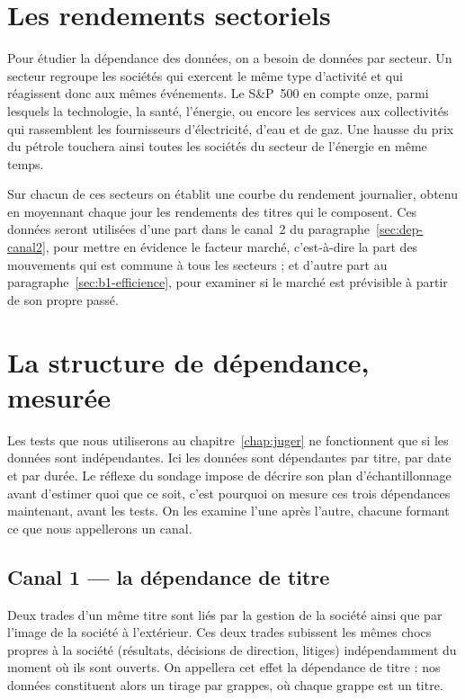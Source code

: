 \section{Les rendements sectoriels}
\label{sec:donnees-secteurs}


Pour étudier la dépendance des données, on a besoin de données par secteur.
Un secteur regroupe les sociétés qui exercent le même type d'activité et qui
réagissent donc aux mêmes événements. Le S\&P~500 en compte onze, parmi
lesquels la technologie, la santé, l'énergie, ou encore les services aux
collectivités qui rassemblent les fournisseurs d'électricité, d'eau et de gaz.
Une hausse du prix du pétrole touchera ainsi toutes les sociétés du secteur de
l'énergie en même temps.

Sur chacun de ces secteurs on établit une courbe du rendement journalier,
obtenu en moyennant chaque jour les rendements des titres qui le composent.
Ces données seront utilisées d'une part dans le canal~2 du
paragraphe~\ref{sec:dep-canal2}, pour mettre en évidence le facteur
marché, c'est-à-dire la part des mouvements qui est commune à tous les
secteurs ; et d'autre part au paragraphe~\ref{sec:b1-efficience}, pour
examiner si le marché est prévisible à partir de son propre passé.


\section{La structure de dépendance, mesurée}
\label{sec:dep-mesuree}


Les tests que nous utiliserons au chapitre~\ref{chap:juger} ne fonctionnent que
si les données sont indépendantes.
Ici les données sont dépendantes par titre, par date et par durée.
Le réflexe du sondage impose de décrire son plan d'échantillonnage avant
d'estimer quoi que ce soit, c'est pourquoi on mesure ces trois dépendances
maintenant, avant les tests. On les examine l'une après l'autre, chacune
formant ce que nous appellerons un canal.

\subsection{Canal 1 --- la dépendance de titre}
\label{sec:dep-canal1}


Deux trades d'un même titre sont liés par la gestion de la société
ainsi que par l'image de la société à l'extérieur.
Ces deux trades subissent les mêmes chocs propres à la société (résultats,
décisions de direction, litiges) indépendamment du moment où ils sont
ouverts.
On appellera cet effet la dépendance de titre : nos données constituent
alors un tirage par grappes, où chaque grappe est un titre.

